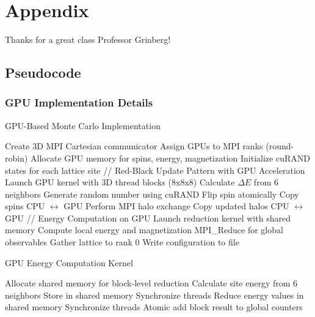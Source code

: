 \documentclass{article}
\begin{document}
\newpage
\appendix
\section{Appendix}
Thanks for a great class Professor Grinberg!

\subsection{Pseudocode}

\subsubsection{GPU Implementation Details}
\begin{algorithm}[H]
\caption{GPU-Based Monte Carlo Implementation}
\begin{algorithmic}[1]
\State Create 3D MPI Cartesian communicator
\State Assign GPUs to MPI ranks (round-robin)
\State Allocate GPU memory for spins, energy, magnetization
\State Initialize cuRAND states for each lattice site
    \State // Red-Black Update Pattern with GPU Acceleration
        \State Launch GPU kernel with 3D thread blocks (8x8x8)
            \State Calculate $\Delta E$ from 6 neighbors
            \State Generate random number using cuRAND
                \State Flip spin atomically
            \EndIf
        \EndFor
        \State Copy spins CPU $\leftrightarrow$ GPU
        \State Perform MPI halo exchange
        \State Copy updated halos CPU $\leftrightarrow$ GPU
    \EndFor
    \State // Energy Computation on GPU
    \State Launch reduction kernel with shared memory
    \State Compute local energy and magnetization
    \State MPI\_Reduce for global observables
        \State Gather lattice to rank 0
        \State Write configuration to file
    \EndIf
\EndFor
\end{algorithmic}
\end{algorithm}

\begin{algorithm}[H]
\caption{GPU Energy Computation Kernel}
\begin{algorithmic}[1]
\State Allocate shared memory for block-level reduction
    \State Calculate site energy from 6 neighbors
    \State Store in shared memory
\EndFor
\State Synchronize threads
        \State Reduce energy values in shared memory
    \EndIf
    \State Synchronize threads
\EndFor
{}
    \State Atomic add block result to global counters
\EndIf
\end{algorithmic}
\end{algorithm}
\end{document}
